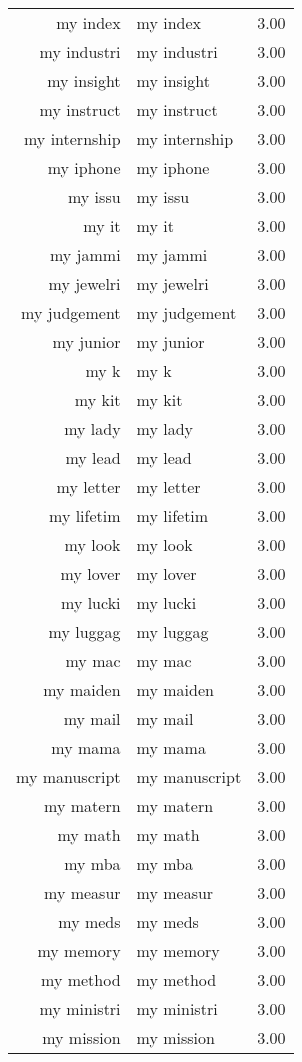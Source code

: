 \begin{table}[ht]
\begin{tabular}{rlr}
  my index & my index & 3.00 \\ 
  my industri & my industri & 3.00 \\ 
  my insight & my insight & 3.00 \\ 
  my instruct & my instruct & 3.00 \\ 
  my internship & my internship & 3.00 \\ 
  my iphone & my iphone & 3.00 \\ 
  my issu & my issu & 3.00 \\ 
  my it & my it & 3.00 \\ 
  my jammi & my jammi & 3.00 \\ 
  my jewelri & my jewelri & 3.00 \\ 
  my judgement & my judgement & 3.00 \\ 
  my junior & my junior & 3.00 \\ 
  my k & my k & 3.00 \\ 
  my kit & my kit & 3.00 \\ 
  my lady & my lady & 3.00 \\ 
  my lead & my lead & 3.00 \\ 
  my letter & my letter & 3.00 \\ 
  my lifetim & my lifetim & 3.00 \\ 
  my look & my look & 3.00 \\ 
  my lover & my lover & 3.00 \\ 
  my lucki & my lucki & 3.00 \\ 
  my luggag & my luggag & 3.00 \\ 
  my mac & my mac & 3.00 \\ 
  my maiden & my maiden & 3.00 \\ 
  my mail & my mail & 3.00 \\ 
  my mama & my mama & 3.00 \\ 
  my manuscript & my manuscript & 3.00 \\ 
  my matern & my matern & 3.00 \\ 
  my math & my math & 3.00 \\ 
  my mba & my mba & 3.00 \\ 
  my measur & my measur & 3.00 \\ 
  my meds & my meds & 3.00 \\ 
  my memory & my memory & 3.00 \\ 
  my method & my method & 3.00 \\ 
  my ministri & my ministri & 3.00 \\ 
  my mission & my mission & 3.00 \\ 

\end{tabular}
\end{table}
